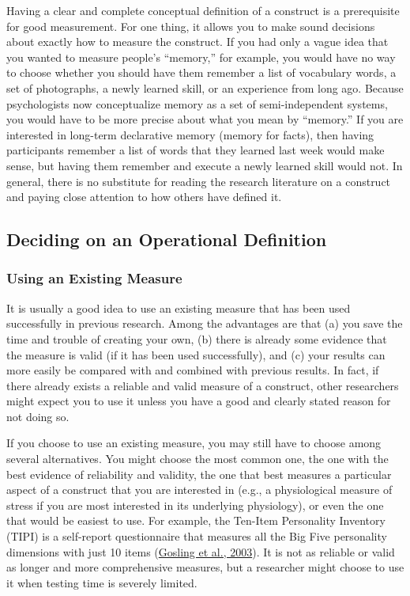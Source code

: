 \documentclass[
]{krantz}
\begin{document}
Having a clear and complete conceptual definition of a construct is a prerequisite for good measurement. For one thing, it allows you to make sound decisions about exactly how to measure the construct. If you had only a vague idea that you wanted to measure people's ``memory,'' for example, you would have no way to choose whether you should have them remember a list of vocabulary words, a set of photographs, a newly learned skill, or an experience from long ago. Because psychologists now conceptualize memory as a set of semi-independent systems, you would have to be more precise about what you mean by ``memory.'' If you are interested in long-term declarative memory (memory for facts), then having participants remember a list of words that they learned last week would make sense, but having them remember and execute a newly learned skill would not. In general, there is no substitute for reading the research literature on a construct and paying close attention to how others have defined it.

\hypertarget{deciding-on-an-operational-definition}{%
\subsection*{Deciding on an Operational Definition}\label{deciding-on-an-operational-definition}}


\hypertarget{using-an-existing-measure}{%
\subsubsection*{Using an Existing Measure}\label{using-an-existing-measure}}


It is usually a good idea to use an existing measure that has been used successfully in previous research. Among the advantages are that (a) you save the time and trouble of creating your own, (b) there is already some evidence that the measure is valid (if it has been used successfully), and (c) your results can more easily be compared with and combined with previous results. In fact, if there already exists a reliable and valid measure of a construct, other researchers might expect you to use it unless you have a good and clearly stated reason for not doing so.

If you choose to use an existing measure, you may still have to choose among several alternatives. You might choose the most common one, the one with the best evidence of reliability and validity, the one that best measures a particular aspect of a construct that you are interested in (e.g., a physiological measure of stress if you are most interested in its underlying physiology), or even the one that would be easiest to use. For example, the Ten-Item Personality Inventory (TIPI) is a self-report questionnaire that measures all the Big Five personality dimensions with just 10 items (\protect\hyperlink{ref-gosling2003very}{Gosling et al., 2003}). It is not as reliable or valid as longer and more comprehensive measures, but a researcher might choose to use it when testing time is severely limited.
\end{document}

